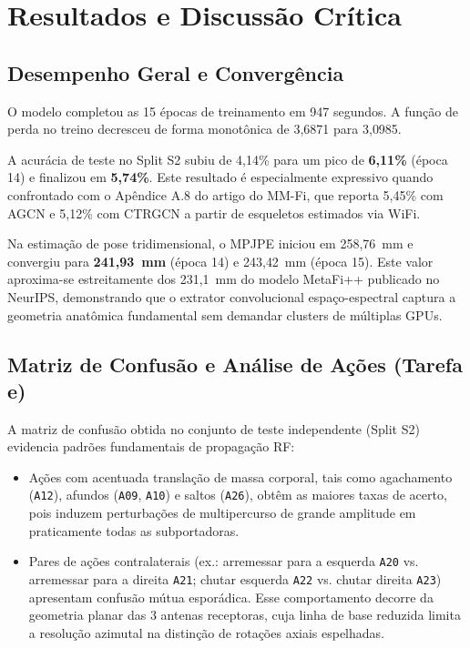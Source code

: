 \documentclass[10pt,a4paper,twocolumn]{article}
\begin{document}
\section{Resultados e Discussão Crítica}

\subsection{Desempenho Geral e Convergência}
O modelo completou as 15 épocas de treinamento em 947 segundos. A função de perda no treino decresceu de forma monotônica de 3{,}6871 para 3{,}0985. 

A acurácia de teste no Split S2 subiu de 4{,}14\% para um pico de \textbf{6{,}11\%} (época 14) e finalizou em \textbf{5{,}74\%}. Este resultado é especialmente expressivo quando confrontado com o Apêndice A.8 do artigo do MM-Fi, que reporta 5{,}45\% com AGCN e 5{,}12\% com CTRGCN a partir de esqueletos estimados via WiFi. 

Na estimação de pose tridimensional, o MPJPE iniciou em 258{,}76~mm e convergiu para \textbf{241{,}93~mm} (época 14) e 243{,}42~mm (época 15). Este valor aproxima-se estreitamente dos 231{,}1~mm do modelo MetaFi++ publicado no NeurIPS, demonstrando que o extrator convolucional espaço-espectral captura a geometria anatômica fundamental sem demandar clusters de múltiplas GPUs.

\subsection{Matriz de Confusão e Análise de Ações (Tarefa e)}
A matriz de confusão obtida no conjunto de teste independente (Split S2) evidencia padrões fundamentais de propagação RF:
\begin{itemize}
    \item Ações com acentuada translação de massa corporal, tais como agachamento (\texttt{A12}), afundos (\texttt{A09}, \texttt{A10}) e saltos (\texttt{A26}), obtêm as maiores taxas de acerto, pois induzem perturbações de multipercurso de grande amplitude em praticamente todas as subportadoras.
    \item Pares de ações contralaterais (ex.: arremessar para a esquerda \texttt{A20} vs. arremessar para a direita \texttt{A21}; chutar esquerda \texttt{A22} vs. chutar direita \texttt{A23}) apresentam confusão mútua esporádica. Esse comportamento decorre da geometria planar das 3 antenas receptoras, cuja linha de base reduzida limita a resolução azimutal na distinção de rotações axiais espelhadas.
\end{itemize}
\end{document}
